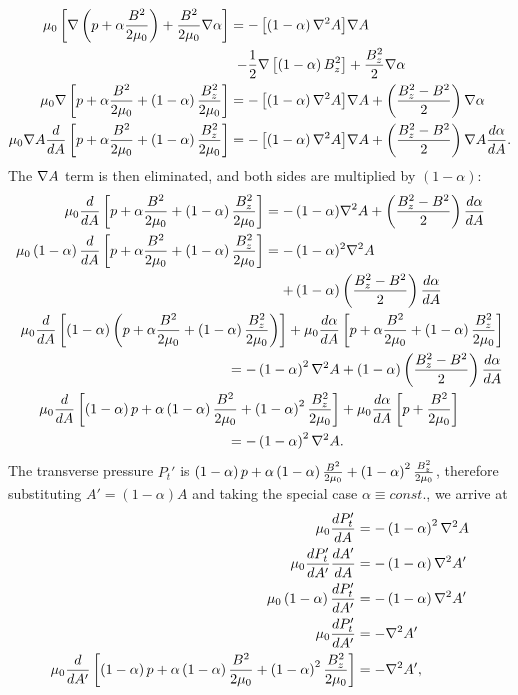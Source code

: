 \[\begin{split}
    \mu_0\left[ \nabla\left( p + \alpha\frac{B^2}{2\mu_0} \right) + \frac{B^2}{2\mu_0}\nabla\alpha \right] = -\left[ \left( 1-\alpha \right)\nabla^2 A \right]& \nabla A \\
    - \frac{1}{2}\nabla\left[ \left( 1-\alpha \right)B_z^2 \right]& + \frac{B_z^2}{2}\nabla\alpha \\
    \mu_0\nabla\left[ p + \alpha\frac{B^2}{2\mu_0} + \left( 1-\alpha \right)\frac{B_z^2}{2\mu_0} \right] = -\left[ \left( 1-\alpha \right)\nabla^2 A \right]&\nabla A + \left( \frac{B_z^2-B^2}{2} \right)\nabla\alpha \\
    \mu_0\nabla A\frac{d}{dA}\left[ p + \alpha\frac{B^2}{2\mu_0} + \left( 1-\alpha \right)\frac{B_z^2}{2\mu_0} \right] = -\left[ \left( 1-\alpha \right)\nabla^2 A \right]&\nabla A + \left( \frac{B_z^2-B^2}{2} \right)\nabla A \frac{d\alpha}{d A}. \\
\end{split}\]
The $\nabla A$ term is then eliminated, and both sides are multiplied by $(1-\alpha)$:
\[\begin{split}
    \mu_0\frac{d}{d A}\left[ p + \alpha\frac{B^2}{2\mu_0} + \left( 1-\alpha \right)\frac{B_z^2}{2\mu_0} \right] = -\left( 1-\alpha \right)&\nabla^2 A + \left( \frac{B_z^2-B^2}{2} \right)\frac{d\alpha}{dA} \\
    \mu_0\left( 1-\alpha \right)\frac{d}{d A}\left[ p + \alpha\frac{B^2}{2\mu_0} + \left( 1-\alpha \right)\frac{B_z^2}{2\mu_0} \right] = -\left( 1-\alpha \right)&^2\nabla^2 A \\
    + \left( 1-\alpha \right)&\left( \frac{B_z^2-B^2}{2} \right)\frac{d\alpha}{dA} \\
    \mu_0\frac{d}{d A}\left[ \left( 1-\alpha \right)\left( p + \alpha\frac{B^2}{2\mu_0} + \left( 1-\alpha \right)\frac{B_z^2}{2\mu_0} \right) \right] + \mu_0\frac{d\alpha}{dA}&\left[ p + \alpha\frac{B^2}{2\mu_0} + \left( 1-\alpha \right)\frac{B_z^2}{2\mu_0} \right] \\
    = -\left( 1-\alpha \right)^2\nabla^2 A &+ \left( 1-\alpha \right)\left( \frac{B_z^2-B^2}{2} \right)\frac{d\alpha}{dA} \\
    \mu_0\frac{d}{d A}\left[ \left( 1-\alpha \right)p + \alpha\left( 1-\alpha \right)\frac{B^2}{2\mu_0} + \left( 1-\alpha \right)^2\frac{B_z^2}{2\mu_0} \right] &+ \mu_0\frac{d\alpha}{dA}\left[ p + \frac{B^2}{2\mu_0} \right] \\
    = -\left( 1-\alpha \right)^2\nabla^2 A&.
\end{split}\]
The transverse pressure $P_t'$ is $\left( 1-\alpha \right)p + \alpha\left( 1-\alpha \right)\frac{B^2}{2\mu_0} + \left( 1-\alpha \right)^2\frac{B_z^2}{2\mu_0}$, therefore substituting $A'=(1-\alpha)A$ and taking the special case $\alpha\equiv const.$, we arrive at
\begin{equation}
    \begin{split}
        \mu_0\frac{dP_t'}{dA} &= -\left( 1-\alpha \right)^2\nabla^2 A \\
        \mu_0\frac{dP_t'}{dA'}\frac{dA'}{dA} &= -\left( 1-\alpha \right)\nabla^2 A' \\
        \mu_0\left( 1-\alpha \right)\frac{dP_t'}{dA'} &= -\left( 1-\alpha \right)\nabla^2 A' \\
        \mu_0\frac{dP_t'}{dA'} &= -\nabla^2 A' \\
        \mu_0\frac{d}{dA'}\left[ \left( 1-\alpha \right)p + \alpha\left( 1-\alpha \right)\frac{B^2}{2\mu_0} + \left( 1-\alpha \right)^2\frac{B_z^2}{2\mu_0} \right] &= -\nabla^2 A', \\
    \end{split}
    \label{eq:extended-deriv}
\end{equation}
